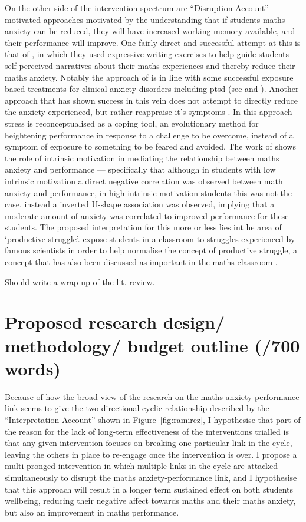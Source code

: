 \documentclass[14pt]{memoir}
\newcommand{\reffig}[1]{\hyperref[fig:#1]{Figure~\ref{fig:#1}}}
\begin{document}
On the other side of the intervention spectrum are ``Disruption Account'' motivated approaches motivated by the understanding that if students maths anxiety can be reduced, they will have increased working memory available, and their performance will improve. One fairly direct and successful attempt at this is that of , in which they used expressive writing exercises to help guide students self-perceived narratives about their maths experiences and thereby reduce their maths anxiety. Notably the approach of  is in line with some successful exposure based treatments for clinical anxiety disorders including \gls{ptsd} (see  and ). Another approach that has shown success in this vein does not attempt to directly reduce the anxiety experienced, but rather reappraise it's symptoms \cite{Jamieson2016}. In this approach stress is reconceptualised as a coping tool, an evolutionary method for heightening performance in response to a challenge to be overcome, instead of a symptom of exposure to something to be feared and avoided. The work of \cite{Wang2015} shows the role of intrinsic motivation in mediating the relationship between maths anxiety and performance --- specifically that although in students with low intrinsic motivation a direct negative correlation was observed between math anxiety and performance, in high intrinsic motivation students this was not the case, instead a inverted U-shape association was observed, implying that a moderate amount of anxiety was correlated to improved performance for these students. The proposed interpretation for this more or less lies int he area of `productive struggle'.  expose students in a classroom to struggles experienced by famous scientists in order to help normalise the concept of productive struggle, a concept that has also been discussed as important in the maths classroom \cite{Hiebert2007}.
 
Should write a wrap-up of the lit. review.


\section{Proposed research design/ methodology/ budget outline (/700 words)}

Because of how the broad view of the research on the maths anxiety-performance link seems to give the two directional cyclic relationship described by the ``Interpretation Account'' shown in \reffig{ramirez}, I hypothesise that part of the reason for the lack of long-term effectiveness of the interventions trialled is that any given intervention focuses on breaking one particular link in the cycle, leaving the others in place to re-engage once the intervention is over. I propose a multi-pronged intervention in which multiple links in the cycle are attacked simultaneously to disrupt the maths anxiety-performance link, and I hypothesise that this approach will result in a longer term sustained effect on both students wellbeing, reducing their negative affect towards maths and their maths anxiety, but also an improvement in maths performance. 
\end{document}
